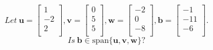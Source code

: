 \documentclass{report}
\begin{document}
\begin{mybox}
\begin{equation*}
Let \: \mathbf{u}=\begin{bmatrix} 1 \\ -2 \\ 2 \\ \end{bmatrix},\mathbf{v}=\begin{bmatrix} 0 \\ 5 \\ 5 \\ \end{bmatrix},\mathbf{w}=\begin{bmatrix} -2 \\ 0 \\ -8 \\ \end{bmatrix},\mathbf{b}=\begin{bmatrix} -1 \\ -11 \\ -6 \\ \end{bmatrix}.
\end{equation*}
\begin{equation*}
Is \: \mathbf{b}\in\mathrm{span}\{\mathbf{u}, \mathbf{v}, \mathbf{w}\}?
\end{equation*}
\end{mybox}
\end{document}

